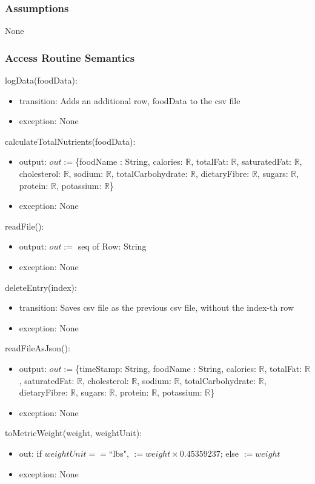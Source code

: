 \documentclass[12pt, titlepage]{article}
\begin{document}
\subsubsection{Assumptions}
None
\subsubsection{Access Routine Semantics}
\noindent logData(foodData):
\begin{itemize}
	\item transition: Adds an additional row, foodData to the csv file 
	\item exception: None
\end{itemize}
\noindent calculateTotalNutrients(foodData):
\begin{itemize}
	\item output: $out :=$\{foodName : String, calories: $\mathbb{R}$, 
	totalFat: $\mathbb{R}$, saturatedFat: $\mathbb{R}$, cholesterol: 
	$\mathbb{R}$, sodium: $\mathbb{R}$, totalCarbohydrate: $\mathbb{R}$, 
	dietaryFibre: $\mathbb{R}$, sugars: $\mathbb{R}$, protein: $\mathbb{R}$, 
	potassium: $\mathbb{R}$\} 
	\item exception: None
\end{itemize}
\noindent readFile():
\begin{itemize}
	\item output: $out :=$ seq of Row: String 
	\item exception: None
\end{itemize}
\noindent deleteEntry(index):
\begin{itemize}
	\item transition: Saves csv file as the previous csv file, without the 
	index-th row
	\item exception: None
\end{itemize}
\noindent readFileAsJson():
\begin{itemize}
	\item output: $out := $\{timeStamp: String, foodName : String, calories: 
	$\mathbb{R}$, 
	totalFat: $\mathbb{R}$, saturatedFat: $\mathbb{R}$, cholesterol: 
	$\mathbb{R}$, sodium: $\mathbb{R}$, totalCarbohydrate: $\mathbb{R}$, 
	dietaryFibre: $\mathbb{R}$, sugars: $\mathbb{R}$, protein: $\mathbb{R}$, 
	potassium: $\mathbb{R}$\} 
	\item exception: None
\end{itemize}
\noindent toMetricWeight(weight, weightUnit):
\begin{itemize}
	\item out: if $weightUnit == $``lbs", $:= weight \times 0.45359237$; else 
	$:= weight$
	\item exception: None
\end{itemize}
\end{document}
